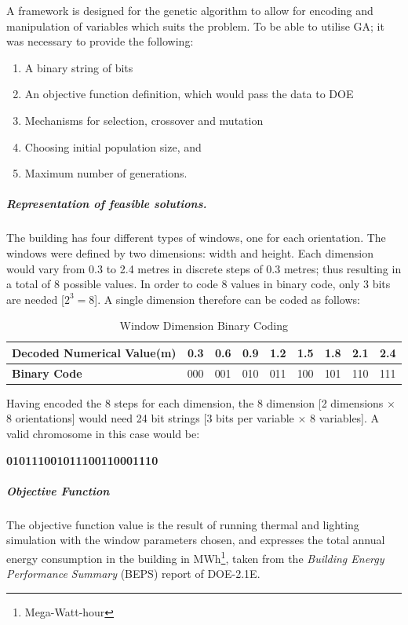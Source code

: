 A framework is designed for the genetic algorithm to allow for encoding and manipulation of variables which suits the problem. To be able to utilise GA; it was necessary to provide the following:
\begin{enumerate}[nolistsep]
\item A binary string of bits
\item An objective function definition, which would pass the data to DOE
\item Mechanisms for selection, crossover and mutation
\item Choosing initial population size, and
\item Maximum number of generations.
\end{enumerate}

\subparagraph{Representation of feasible solutions.}\mbox{}

The building has four different types of windows, one for each orientation. The windows were defined by two dimensions: width and height. Each dimension would vary from 0.3 to 2.4 metres in discrete steps of 0.3 metres; thus resulting in a total of 8 possible values. In order to code 8 values in binary code, only 3 bits are needed [$2^3=8$]. A single dimension therefore can be coded as follows:

\begin{table}[h]
\centering
\begin{tabular}{l|rrrrrrrr}
\textbf{Decoded Numerical Value(m)}&0.3&0.6&0.9&1.2&1.5&1.8&2.1&2.4\\ \hline
\textbf{Binary Code}&000&001&010&011&100&101&110&111\\
\end{tabular}
\caption{Window Dimension Binary Coding}
\label{table:WinDimCode}
\end{table}

Having encoded the 8 steps for each dimension, the 8 dimension [2 dimensions $\times$ 8 orientations] would need 24 bit strings [3 bits per variable $\times$ 8 variables]. A valid chromosome in this case would be:\\
\vspace{0.3cm}
\begin{center}
\textbf{010111001011100110001110}
\end{center}

\subparagraph{Objective Function}\mbox{}

The objective function value is the result of running thermal and lighting simulation with the window parameters chosen, and expresses the total annual energy consumption in the building in MWh\footnote{Mega-Watt-hour}, taken from the \emph{Building Energy Performance Summary} (BEPS) report of DOE-2.1E.

